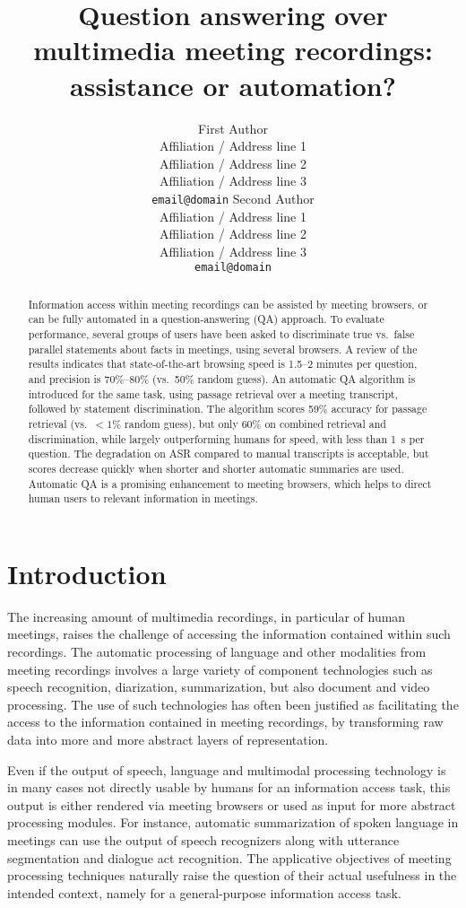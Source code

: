 \documentclass[11pt]{article}
\title{Question answering over multimedia meeting recordings:\\assistance or automation?}
\author{First Author\\
  Affiliation / Address line 1\\
  Affiliation / Address line 2\\
  Affiliation / Address line 3\\
  {\tt email@domain}  \And
  Second Author\\
  Affiliation / Address line 1\\
  Affiliation / Address line 2\\
  Affiliation / Address line 3\\
  {\tt email@domain}}
\date{}
\begin{document}
\maketitle
\begin{abstract}
Information access within meeting recordings
can be assisted by meeting browsers, or can be fully automated in a question-answering (QA) approach.  To evaluate performance, several groups of users have been asked to discriminate true vs.\ false parallel statements about facts in meetings, using several browsers.  A review of the results indicates that state-of-the-art browsing speed is 1.5--2 minutes per question, and precision is 70\%--80\% (vs.\ 50\% random guess).  An automatic QA algorithm is introduced for the same task, using passage retrieval over a meeting transcript, followed by statement discrimination.  The algorithm scores 59\% accuracy for passage retrieval (vs.\ $< 1\%$ random guess), but only 60\% on combined retrieval and discrimination, while largely outperforming humans for speed, with less than 1~s per question.  The degradation on ASR compared to manual transcripts is acceptable, but scores decrease quickly when shorter and shorter automatic summaries are used.  Automatic QA is a promising enhancement to meeting browsers, which helps to direct human users to relevant information in meetings.
\end{abstract}

\section{Introduction}
\label{sec:intro}

The increasing amount of multimedia recordings, in particular of human meetings, raises the challenge of accessing the information contained within such recordings.  The automatic processing of language and other modalities from meeting recordings involves a large variety of component technologies such as speech recognition, diarization, summarization, but also document and video processing.  The use of such technologies has often been justified as facilitating the access to the information contained in meeting recordings, by transforming raw data into more and more abstract layers of representation.  

Even if the output of speech, language and multimodal processing technology is in many cases not directly usable by humans for an information access task, this output is either rendered via meeting browsers or used as input for more abstract processing modules.  For instance, automatic summarization of spoken language in meetings can use the output of speech recognizers along with utterance segmentation and dialogue act recognition.  The applicative objectives of meeting processing techniques naturally raise the question of their actual usefulness in the intended context, namely for a general-purpose information access task.  
\end{document}
